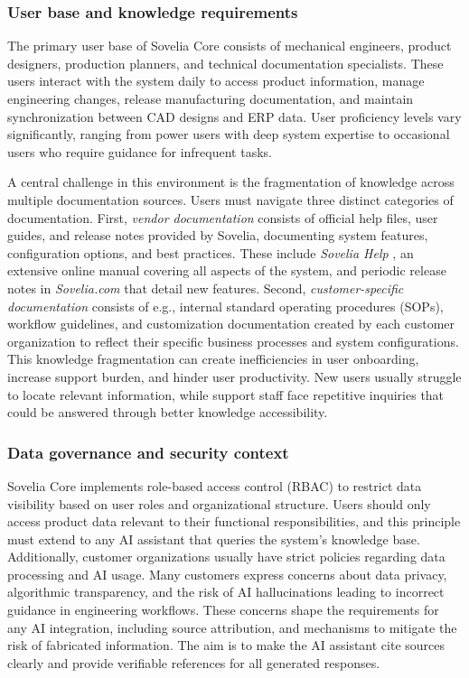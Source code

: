\subsubsection{User base and knowledge requirements}

The primary user base of Sovelia Core consists of mechanical engineers, product designers, production planners, and technical documentation specialists. These users interact with the system daily to access product information, manage engineering changes, release manufacturing documentation, and maintain synchronization between CAD designs and ERP data. User proficiency levels vary significantly, ranging from power users with deep system expertise to occasional users who require guidance for infrequent tasks.

A central challenge in this environment is the fragmentation of knowledge across multiple documentation sources. Users must navigate three distinct categories of documentation. First, \textit{vendor documentation} consists of official help files, user guides, and release notes provided by Sovelia, documenting system features, configuration options, and best practices. These include \textit{Sovelia Help} \parencite{SoveliaHelp}, an extensive online manual covering all aspects of the system, and periodic release notes in \textit{Sovelia.com} \parencite{DigitalSolutionsEngineering} that detail new features. Second, \textit{customer-specific documentation} consists of e.g., internal standard operating procedures (SOPs), workflow guidelines, and customization documentation created by each customer organization to reflect their specific business processes and system configurations. This knowledge fragmentation can create inefficiencies in user onboarding, increase support burden, and hinder user productivity. New users usually struggle to locate relevant information, while support staff face repetitive inquiries that could be answered through better knowledge accessibility.

\subsubsection{Data governance and security context}

Sovelia Core implements role-based access control (RBAC) \parencite{sandhuRolebasedAccessControl1996} to restrict data visibility based on user roles and organizational structure. Users should only access product data relevant to their functional responsibilities, and this principle must extend to any AI assistant that queries the system's knowledge base. Additionally, customer organizations usually have strict policies regarding data processing and AI usage. Many customers express concerns about data privacy, algorithmic transparency, and the risk of AI hallucinations leading to incorrect guidance in engineering workflows. These concerns shape the requirements for any AI integration, including source attribution, and mechanisms to mitigate the risk of fabricated information. The aim is to make the AI assistant cite sources clearly and provide verifiable references for all generated responses.

